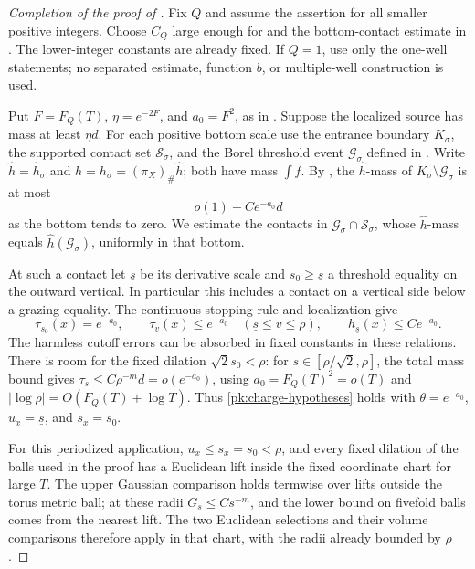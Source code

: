 \begin{proof}[Completion of the proof of ]
Fix $Q$ and assume the assertion for all smaller positive
integers.  Choose $C_Q$ large enough for
 and
the bottom-contact estimate in .  The
lower-integer constants are already fixed.  If $Q=1$, use
only the one-well statements; no separated estimate, function
$b$, or multiple-well construction is used.

Put $F=F_Q(T)$, $\eta=e^{-2F}$, and $a_0=F^2$, as in
.  Suppose the localized source has mass
at least $\eta d$. For each positive bottom scale use the entrance
boundary $K_\sigma$, the supported contact set $\mathcal S_\sigma$,
and the Borel threshold event $\mathcal G_\sigma$ defined in
. Write $\widehat h=\widehat h_\sigma$ and
$h=h_\sigma=(\pi_X)_\#\widehat h$; both have mass $\int f$.
By , the $\widehat h$-mass of
$K_\sigma\setminus\mathcal G_\sigma$ is at most
\begin{equation}\label{pk:bottom-remainder}
 o(1)+Ce^{-a_0}d
\end{equation}
as the bottom tends to zero. We estimate the contacts in
$\mathcal G_\sigma\cap\mathcal S_\sigma$, whose $\widehat h$-mass
equals $\widehat h(\mathcal G_\sigma)$, uniformly in that bottom.

At such a contact let $\underline s$ be its derivative scale
and $s_0\ge\underline s$ a threshold equality on the
outward vertical.  In particular this includes a contact on
a vertical side below a grazing equality.  The continuous
stopping rule and localization give
\[
 \tau_{s_0}(x)=e^{-a_0},\qquad
 \tau_v(x)\le e^{-a_0}\quad(\underline s\le v\le\rho),
 \qquad h_{\underline s}(x)\le Ce^{-a_0}.
\]
The harmless cutoff errors can be absorbed in fixed constants
in these relations.  There is room for the fixed dilation
$\sqrt2s_0<\rho$: for $s\in[\rho/\sqrt2,\rho]$, the total
mass bound gives $\tau_s\le C\rho^{-m}d=o(e^{-a_0})$,
using $a_0=F_Q(T)^2=o(T)$ and
$|\log\rho|=O(F_Q(T)+\log T)$.  Thus
\eqref{pk:charge-hypotheses} holds with
$\theta=e^{-a_0}$, $u_x=\underline s$, and $s_x=s_0$.

For this periodized application, \(u_x\le s_x=s_0<\rho\), and every
fixed dilation of the balls used in the proof has a Euclidean lift
inside the fixed coordinate chart for large \(T\). The upper Gaussian
comparison holds termwise over lifts outside the torus metric ball;
at these radii \(G_s\le Cs^{-m}\), and the lower bound on fivefold
balls comes from the nearest lift. The two Euclidean selections and
their volume comparisons therefore apply in that chart, with the
radii already bounded by \(\rho\).


\end{proof}
